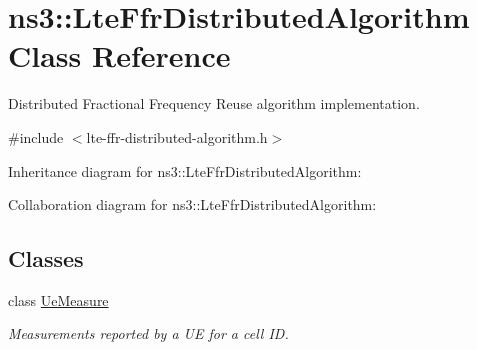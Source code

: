 \hypertarget{classns3_1_1LteFfrDistributedAlgorithm}{}\section{ns3\+:\+:Lte\+Ffr\+Distributed\+Algorithm Class Reference}
\label{classns3_1_1LteFfrDistributedAlgorithm}


Distributed Fractional Frequency Reuse algorithm implementation.  




{\ttfamily \#include $<$lte-\/ffr-\/distributed-\/algorithm.\+h$>$}



Inheritance diagram for ns3\+:\+:Lte\+Ffr\+Distributed\+Algorithm\+:


Collaboration diagram for ns3\+:\+:Lte\+Ffr\+Distributed\+Algorithm\+:
\subsection*{Classes}
\begin{DoxyCompactItemize}
\item 
class \hyperlink{classns3_1_1LteFfrDistributedAlgorithm_1_1UeMeasure}{Ue\+Measure}
\begin{DoxyCompactList}\small\item\em Measurements reported by a UE for a cell ID. \end{DoxyCompactList}\end{DoxyCompactItemize}
